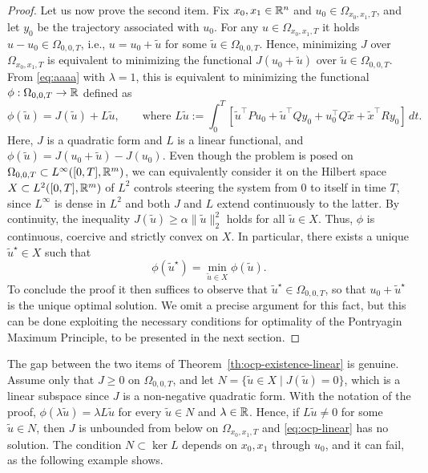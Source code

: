 \begin{proof}
    Let us now prove the second item.
    Fix $x_0,x_1\in\mathbb{R}^n$ and $u_0\in \Omega_{x_0,x_1,T}$, and let $y_0$ be the trajectory associated with $u_0$.
    For any $u\in \Omega_{x_0,x_1,T}$ it holds $u - u_0 \in \Omega_{0,0,T}$, i.e., $u=u_0+\tilde u$ for some $\tilde u\in \Omega_{0,0,T}$. Hence, minimizing $J$ over $\Omega_{x_0,x_1,T}$ is equivalent to minimizing the functional $J(u_0+\tilde u)$ over $\tilde u\in \Omega_{0,0,T}$.
    From \eqref{eq:aaaa} with $\lambda=1$, this is equivalent to minimizing the functional $\phi:\Omega_{0,0,T}\to \mathbb{R}$ defined as
    \begin{equation}
        \label{eq:phi-lq}
        \phi(\tilde u) = J(\tilde u) + L \tilde u,
        \qquad \text{where }
        L \tilde u :=\int_0^T \left[\tilde u^\top P u_0 + \tilde u^\top Q y_0 + u_0^\top Q \tilde x + \tilde x^\top Ry_0 \right] \, dt.
    \end{equation}
    Here, $J$ is a quadratic form and $L$ is a linear functional, and $\phi(\tilde u) = J(u_0+\tilde u)-J(u_0)$.
    Even though the problem is posed on $\Omega_{0,0,T}\subset L^\infty([0,T],\mathbb{R}^m)$, we can equivalently consider it on the Hilbert space $X\subset L^2([0,T],\mathbb{R}^m)$ of $L^2$ controls steering the system from $0$ to itself in time $T$, since $L^\infty$ is dense in $L^2$ and both $J$ and $L$ extend continuously to the latter.
    By continuity, the inequality $J(\tilde u)\ge\alpha\|\tilde u\|_2^2$ holds for all $\tilde u\in X$.
    Thus, $\phi$ is continuous, coercive and strictly convex on $X$.
    In particular, there exists a unique $\tilde u^\star \in X$ such that
    \begin{equation}
        \phi(\tilde u^\star) = \min_{\tilde u\in X} \phi(\tilde u).
    \end{equation}
    To conclude the proof it then suffices to observe that $\tilde u^\star\in \Omega_{0,0,T}$, so that $u_0+\tilde u^\star$ is the unique optimal solution. We omit a precise argument for this fact, but this can be done exploiting the necessary conditions for optimality of the Pontryagin Maximum Principle, to be presented in the next section.
\end{proof}

The gap between the two items of Theorem~\ref{th:ocp-existence-linear} is genuine.
Assume only that $J\ge0$ on $\Omega_{0,0,T}$, and let $N = \{\tilde u\in X\mid J(\tilde u)=0\}$, which is a linear subspace since $J$ is a non-negative quadratic form.
With the notation of the proof, $\phi(\lambda\tilde u) = \lambda L\tilde u$ for every $\tilde u\in N$ and $\lambda\in\mathbb{R}$.
Hence, if $L\tilde u\neq0$ for some $\tilde u\in N$, then $J$ is unbounded from below on $\Omega_{x_0,x_1,T}$ and \eqref{eq:ocp-linear} has no solution.
The condition $N\subset\ker L$ depends on $x_0,x_1$ through $u_0$, and it can fail, as the following example shows.


